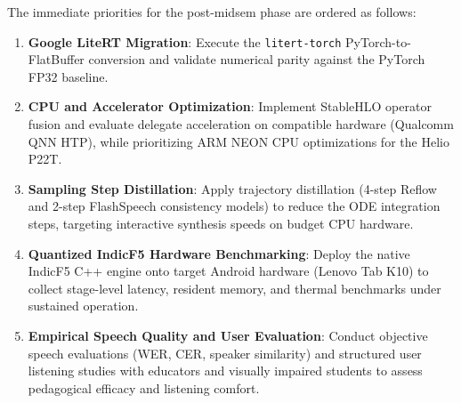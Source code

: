 The immediate priorities for the post-midsem phase are ordered as follows:
\begin{enumerate}
    \item \textbf{Google LiteRT Migration}: Execute the \texttt{litert-torch} PyTorch-to-FlatBuffer conversion and validate numerical parity against the PyTorch FP32 baseline.
    \item \textbf{CPU and Accelerator Optimization}: Implement StableHLO operator fusion and evaluate delegate acceleration on compatible hardware (Qualcomm QNN HTP), while prioritizing ARM NEON CPU optimizations for the Helio P22T.
    \item \textbf{Sampling Step Distillation}: Apply trajectory distillation (4-step Reflow and 2-step FlashSpeech consistency models) to reduce the ODE integration steps, targeting interactive synthesis speeds on budget CPU hardware.
    \item \textbf{Quantized IndicF5 Hardware Benchmarking}: Deploy the native IndicF5 C++ engine onto target Android hardware (Lenovo Tab K10) to collect stage-level latency, resident memory, and thermal benchmarks under sustained operation.
    \item \textbf{Empirical Speech Quality and User Evaluation}: Conduct objective speech evaluations (WER, CER, speaker similarity) and structured user listening studies with educators and visually impaired students to assess pedagogical efficacy and listening comfort.
\end{enumerate}
